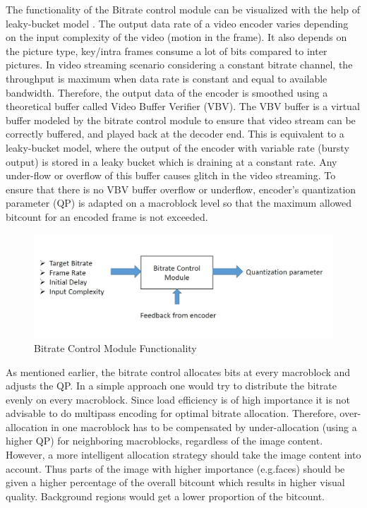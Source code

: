 \documentclass[11pt]{article} %
\begin{document}
	The functionality of the Bitrate control module can be visualized with the help of leaky-bucket model \cite{InTech-Rate-control-in-video-coding}. The output data rate of a video encoder varies depending on the input complexity of the video (motion in the frame). It also depends on the picture type,  key/intra frames consume a lot of bits compared to inter pictures. In video streaming scenario considering a constant bitrate channel, the throughput is maximum when data rate is constant and equal to available bandwidth. Therefore, the output data of the encoder is smoothed using a theoretical buffer called Video Buffer Verifier (VBV). The VBV buffer is a virtual buffer modeled by the bitrate control module to ensure that video stream can be correctly buffered, and played back at the decoder end. This is equivalent to a leaky-bucket model, where the output of the encoder with variable rate (bursty output) is stored in a leaky bucket which is draining at a constant rate.  Any under-flow or overflow of this buffer causes glitch in the video streaming. To ensure that there is no VBV buffer overflow or underflow, encoder's quantization parameter (QP) is adapted on a macroblock level so that the maximum allowed bitcount for an encoded frame is not exceeded.
	
\begin{figure}[h]
    \centering
    \includegraphics[scale=0.5]{RC_block}
    \caption{Bitrate Control Module Functionality}
    \label{fig:Bitrate Control Module Functionality}
\end{figure} 

 As mentioned earlier, the bitrate control allocates bits at every macroblock and adjusts the QP. In a simple approach one would try to distribute the bitrate evenly on every macroblock. Since load efficiency is of high importance it is not advisable to do multipass encoding for optimal bitrate allocation. Therefore, over-allocation in one macroblock has to be compensated by under-allocation (using a higher QP) for neighboring macroblocks, regardless of the image content. However, a more intelligent allocation strategy should take the image content into account. Thus parts of the image with higher importance (e.g.faces) should be given a higher percentage of the overall bitcount which results in higher visual quality. Background regions would get a lower proportion of the bitcount.
\end{document}
